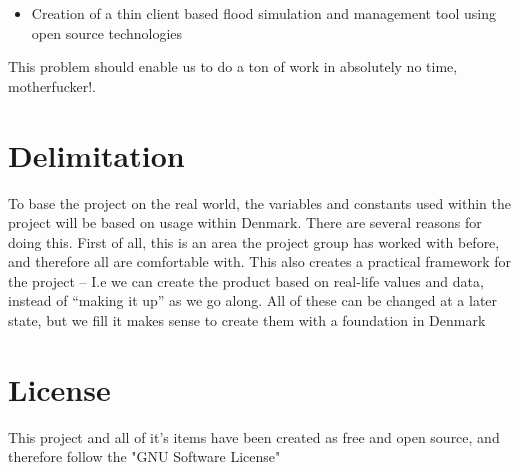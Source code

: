 \begin{itemize}
\item Creation of a thin client based flood simulation and management tool using open source technologies
\end{itemize}

\noindent This problem should enable us to do a ton of work in absolutely no time, motherfucker!.

\section{Delimitation}
To base the project on the real world, the variables and constants used within the project will be based on usage within Denmark.   
There are several reasons for doing this. First of all, this is an area the project group has worked with before, and therefore all are comfortable with. This also creates a practical framework for the project – I.e we can create the product based on real-life values and data, instead of “making it up” as we go along. 
All of these can be changed at a later state, but we fill it makes sense to create them with a foundation in Denmark


\section{License}

This project and all of it's items have been created as free and open source, and therefore follow the "GNU Software License"